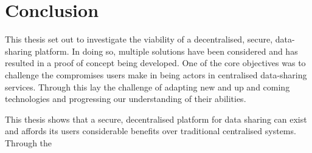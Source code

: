 \section{Conclusion}

This thesis set out to investigate the viability of a decentralised, secure, data-sharing platform. In doing so, multiple solutions have been considered and has resulted in a proof of concept being developed. One of the core objectives was to challenge the compromises users make in being actors in centralised data-sharing services. Through this lay the challenge of adapting new and up and coming technologies and progressing our understanding of their abilities.

This thesis shows that a secure, decentralised platform for data sharing can exist and affords its users considerable benefits over traditional centralised systems. Through the
